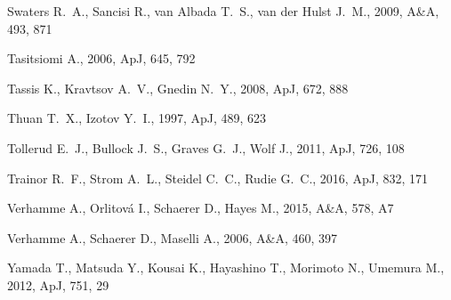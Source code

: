 \documentclass[a4,useAMS,usenatbib,usegraphicx]{mn2e}
\newcommand{\apj}{ApJ}
\newcommand{\aap}{A\&A}
\begin{document}
\begin{thebibliography}{}
{Swaters} R.~A.,  {Sancisi} R.,  {van Albada} T.~S.,    {van der Hulst} J.~M.,
  2009, \aap, 493, 871

{Tasitsiomi} A.,  2006, \apj, 645, 792

{Tassis} K.,  {Kravtsov} A.~V.,    {Gnedin} N.~Y.,  2008, \apj, 672, 888

{Thuan} T.~X.,  {Izotov} Y.~I.,  1997, \apj, 489, 623

{Tollerud} E.~J.,  {Bullock} J.~S.,  {Graves} G.~J.,    {Wolf} J.,  2011, \apj,
  726, 108

{Trainor} R.~F.,  {Strom} A.~L.,  {Steidel} C.~C.,    {Rudie} G.~C.,  2016,
  \apj, 832, 171

{Verhamme} A.,  {Orlitov{\'a}} I.,  {Schaerer} D.,    {Hayes} M.,  2015, \aap,
  578, A7

{Verhamme} A.,  {Schaerer} D.,    {Maselli} A.,  2006, \aap, 460, 397

{Yamada} T.,  {Matsuda} Y.,  {Kousai} K.,  {Hayashino} T.,  {Morimoto} N.,
  {Umemura} M.,  2012, \apj, 751, 29

\end{thebibliography}
\end{document}
